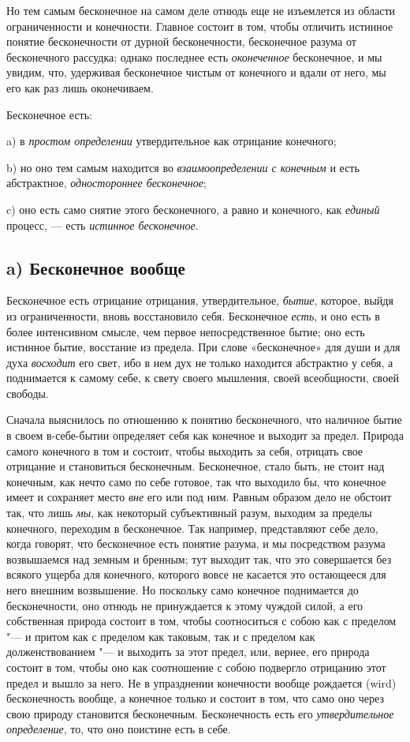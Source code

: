 Но тем самым бесконечное на самом деле отнюдь еще не изъемлется из области
ограниченности и конечности. Главное состоит в том, чтобы отличить истинное
понятие бесконечности от дурной бесконечности, бесконечное разума от
бесконечного рассудка; однако последнее есть
{\em оконеченное} бесконечное, и мы увидим, что,
удерживая бесконечное чистым от конечного и вдали от него, мы его как раз
лишь оконечиваем.

Бесконечное есть:

a) в {\em простом определении} утвердительное как
отрицание конечного;

b) но оно тем самым находится во {\em взаимоопределении
с конечным} и есть абстрактное, {\em одностороннее
бесконечное};

c) оно есть само снятие этого бесконечного, а равно и конечного, как
{\em единый} процесс, — есть
{\em истинное бесконечное}.

\subsection*{a) Бесконечное вообще}
Бесконечное есть отрицание отрицания, утвердительное,
{\em бытие}, которое, выйдя из ограниченности, вновь
восстановило себя. Бесконечное {\em есть}, и оно есть в
более интенсивном смысле, чем первое непосредственное бытие; оно есть
истинное бытие, восстание из предела. При слове «бесконечное» для души и
для духа {\em восходит} его свет, ибо в нем дух не
только находится абстрактно у себя, а поднимается к самому себе, к свету
своего мышления, своей всеобщности, своей свободы.

Сначала выяснилось по отношению к понятию бесконечного, что наличное бытие в
своем в-себе-бытии определяет себя как конечное и выходит за предел.
Природа самого конечного в том и состоит, чтобы выходить за себя, отрицать
свое отрицание и становиться бесконечным. Бесконечное, стало быть, не стоит
над конечным, как нечто само по себе готовое, так что выходило бы, что
конечное имеет и сохраняет место {\em вне} его или под
ним. Равным образом дело не обстоит так, что лишь
{\em мы}, как некоторый субъективный разум, выходим за
пределы конечного, переходим в бесконечное. Так например, представляют себе
дело, когда говорят, что бесконечное есть понятие разума, и мы посредством
разума возвышаемся над земным и бренным; тут выходит так, что это
совершается без всякого ущерба для конечного, которого вовсе не касается
это остающееся для него внешним возвышение. Но поскольку само конечное
поднимается до бесконечности, оно отнюдь не принуждается к этому чуждой
силой, а его собственная природа состоит в том, чтобы соотноситься с собою
как с пределом "--- и притом как с пределом как таковым, так и с пределом как
долженствованием "--- и выходить за этот предел, или, вернее, его природа
состоит в том, чтобы оно как соотношение с собою подвергло отрицанию этот
предел и вышло за него. Не в упразднении конечности вообще рождается (wird)
бесконечность вообще, а конечное только и состоит в том, что само оно через
свою природу становится бесконечным. Бесконечность есть его
{\em утвердительное определение}, то, что оно поистине
есть в себе.

